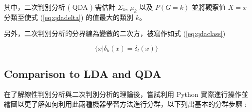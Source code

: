 其中，二次判別分析 ( QDA ) 需估計 $\Sigma_k$, $\mu_k$ 以及 $P(G=k)$ 並將觀察值 $X=x$ 分類至使式 (\ref{eq:qdadelta}) 的值最大的類別 $k$。

另外，二次判別分析的分界線為變數的二次方，被寫作如式 (\ref{eq:qdaclass})

\begin{equation}\label{eq:qdaclass}
\{  x|\delta_k(x)=\delta_l(x) \}
\end{equation}


\subsection{Comparison to LDA and QDA}

在了解線性判別分析與二次判別分析的理論後，嘗試利用 Python 實際進行操作並繪圖以更了解如何利用此兩種機器學習方法進行分群，以下列出基本的分群步驟 :

\newpage

